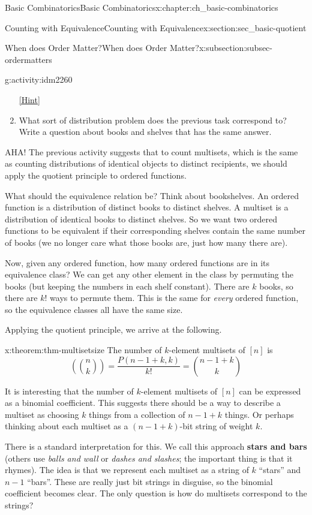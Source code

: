 \documentclass[oneside,10pt,]{book}
\newcommand{\terminology}[1]{\textbf{#1}}
\numberwithin{equation}{chapter}
\newcommand{\mchoose}[2]{\left(\!\binom{#1}{#2}\!\right)}
\begin{document}
\begin{chapterptx}{Basic Combinatorics}{}{Basic Combinatorics}{}{}{x:chapter:ch_basic-combinatorics}
\begin{sectionptx}{Counting with Equivalence}{}{Counting with Equivalence}{}{}{x:section:sec_basic-quotient}
\begin{subsectionptx}{When does Order Matter?}{}{When does Order Matter?}{}{}{x:subsection:subsec-ordermatters}
\begin{activity}{}{g:activity:idm2260}
\begin{enumerate}[font=\bfseries,label=(\alph*),ref=\alph*]
\space\hspace*{0pt}\hfill{\tiny\hyperlink{g:hint:idm2284-back}{[Hint]}}\item{}What sort of distribution problem does the previous task correspond to?  Write a question about books and shelves that has the same answer.%
\end{enumerate}
\end{activity}
AHA!  The previous activity suggests that to count multisets, which is the same as counting distributions of identical objects to distinct recipients, we should apply the quotient principle to ordered functions.%
\par
What should the equivalence relation be?  Think about bookshelves.  An ordered function is a distribution of distinct books to distinct shelves.  A multiset is a distribution of identical books to distinct shelves.  So we want two ordered functions to be equivalent if their corresponding shelves contain the same number of books (we no longer care what those books are, just how many there are).%
\par
Now, given any ordered function, how many ordered functions are in its equivalence class?  We can get any other element in the class by permuting the books (but keeping the numbers in each shelf constant).  There are \(k\) books, so there are \(k!\) ways to permute them.  This is the same for \emph{every} ordered function, so the equivalence classes all have the same size.%
\par
Applying the quotient principle, we arrive at the following.%
\begin{theorem}{}{}{x:theorem:thm-multisetsize}%
The number of \(k\)-element multisets of \([n]\) is%
\begin{equation*}
\mchoose{n}{k} = \frac{P(n-1+k, k)}{k!} = \binom{n-1+k}{k}
\end{equation*}
%
\end{theorem}
It is interesting that the number of \(k\)-element multisets of \([n]\) can be expressed as a binomial coefficient.  This suggests there should be a way to describe a multiset as choosing \(k\) things from a collection of \(n-1+k\) things. Or perhaps thinking about each multiset as a \((n-1+k)\)-bit string of weight \(k\).%
\par
There is a standard interpretation for this.  We call this approach \terminology{stars and bars} (others use \emph{balls and wall} or \emph{dashes and slashes}; the important thing is that it rhymes).  The idea is that we represent each multiset as a string of \(k\) ``stars'' and \(n-1\) ``bars''.  These are really just bit strings in disguise, so the binomial coefficient becomes clear.  The only question is how do multisets correspond to the strings?%

\end{subsectionptx}
\end{sectionptx}
\end{chapterptx}
\end{document}

